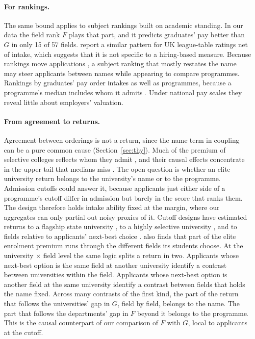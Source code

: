 \paragraph{For rankings.} The same bound applies to subject rankings built on academic standing. In our data the
field rank $F$ plays that part, and it predicts graduates' pay better than $G$ in only 15 of 57 fields.
\citet{britton2022how} report a similar pattern for UK league-table ratings net of intake, which suggests that it is
not specific to a hiring-based measure. Because rankings move applications \citep{bowman2009getting,
luca2013salience}, a subject ranking that mostly restates the name may steer applicants between names while
appearing to compare programmes. Rankings by graduates' pay order intakes as well as programmes, because a
programme's median includes whom it admits \citep{dale2002estimating}. Under national pay scales they reveal little
about employers' valuation.

\paragraph{From agreement to returns.} Agreement between orderings is not a return, since the name term in coupling
can be a pure common cause (Section~\ref{sec:thy}). Much of the premium of selective colleges reflects whom they
admit \citep{dale2002estimating, dale2014estimating}, and their causal effects concentrate in the upper tail that
medians miss \citep{zimmerman2019elite, chetty2023diversifying}. The open question is whether an elite-university
return belongs to the university's name or to the programme. Admission cutoffs could answer it, because applicants
just either side of a programme's cutoff differ in admission but barely in the score that ranks them. The design
therefore holds intake ability fixed at the margin, where our aggregates can only partial out noisy proxies of it.
Cutoff designs have estimated returns to a flagship state university \citep{hoekstra2009effect}, to a highly
selective university \citep{anelli2020returns}, and to fields relative to applicants' next-best choice
\citep{kirkeboen2016field}. \citet{anelli2020returns} also finds that part of the elite enrolment premium runs
through the different fields its students choose. At the university $\times$ field level the same logic splits a
return in two. Applicants whose next-best option is the same field at another university identify a contrast between
universities within the field. Applicants whose next-best option is another field at the same university identify a
contrast between fields that holds the name fixed. Across many contrasts of the first kind, the part of the return
that follows the universities' gap in $G$, field by field, belongs to the name. The part that follows the
departments' gap in $F$ beyond it belongs to the programme. This is the causal counterpart of our comparison of $F$
with $G$, local to applicants at the cutoff.

